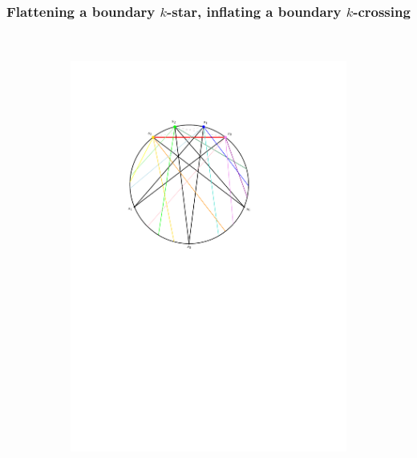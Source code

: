 \documentclass{amsart}
\theoremstyle{remark}
\begin{document}

\subsubsection{Flattening a boundary $k$-star, inflating a boundary $k$-crossing}

~

\begin{figure}[h]
  \centering
  \begin{subfigure}[b]{.48\textwidth}
	\centering
	\includegraphics[width=\textwidth,page=1]{exFlattening}
  \end{subfigure}
  \begin{subfigure}[b]{.48\textwidth}
    \centering

\end{subfigure}
\end{figure}
\end{document}
